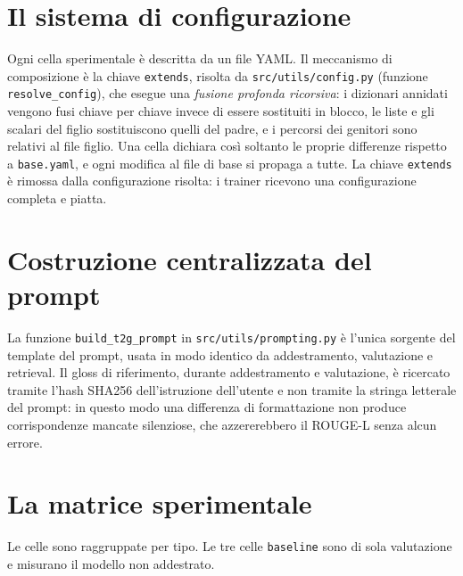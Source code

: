 \section{Il sistema di configurazione}

Ogni cella sperimentale è descritta da un file YAML. Il meccanismo di
composizione è la chiave \texttt{extends}, risolta da
\texttt{src/utils/config.py} (funzione \texttt{resolve\_config}), che esegue una
\emph{fusione profonda ricorsiva}: i dizionari annidati vengono fusi chiave per
chiave invece di essere sostituiti in blocco, le liste e gli scalari del figlio
sostituiscono quelli del padre, e i percorsi dei genitori sono relativi al file
figlio. Una cella dichiara così soltanto le proprie differenze rispetto a
\texttt{base.yaml}, e ogni modifica al file di base si propaga a tutte. La chiave
\texttt{extends} è rimossa dalla configurazione risolta: i trainer ricevono una
configurazione completa e piatta.

\section{Costruzione centralizzata del prompt}

La funzione \texttt{build\_t2g\_prompt} in \texttt{src/utils/prompting.py} è
l'unica sorgente del template del prompt, usata in modo identico da
addestramento, valutazione e retrieval. Il gloss di riferimento, durante
addestramento e valutazione, è ricercato tramite l'hash SHA256 dell'istruzione
dell'utente e non tramite la stringa letterale del prompt: in questo modo una
differenza di formattazione non produce corrispondenze mancate silenziose, che
azzererebbero il ROUGE-L senza alcun errore.

\section{La matrice sperimentale}

Le celle sono raggruppate per tipo. Le tre celle \texttt{baseline} sono di sola
valutazione e misurano il modello non addestrato.

